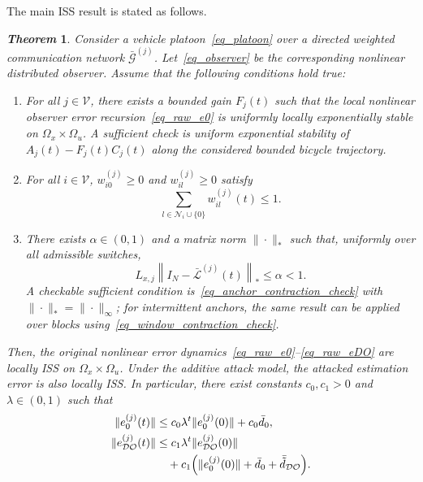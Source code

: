 \documentclass[journal,twoside]{IEEEtran}
\def\V{\mathcal{V}} %
\def\G{\mathcal{G}} %
\def\L{\mathcal{L}} %
\def\N{\mathcal{N}} %
\def\DO{\mathcal{DO}} %
\newtheorem{theorem}{\it Theorem}%
\begin{document}
The main ISS result is stated as follows.
\begin{theorem}\label{thm_observer}
Consider a vehicle platoon~\eqref{eq_platoon} over a directed weighted communication network $\bar{\G}^{(j)}$. Let~\eqref{eq_observer} be the corresponding nonlinear distributed observer. Assume that the following conditions hold true:
\begin{enumerate}
    \item For all $j \in \V$, there exists a bounded gain $F_{j}(t)$ such that the local nonlinear observer error recursion~\eqref{eq_raw_e0} is uniformly locally exponentially stable on $\Omega_x\times\Omega_u$. A sufficient check is uniform exponential stability of $A_j(t)-F_j(t)C_j(t)$ along the considered bounded bicycle trajectory.
    \item For all $i \in \V$, $w_{i0}^{(j)} \geq 0$ and $w_{il}^{(j)} \geq 0$ satisfy
    \begin{equation}\label{thm_W}%
    \sum_{l\in \N_i\cup\{0\}} w_{il}^{(j)}(t) \leq 1.
    \end{equation}
    \item There exists $\alpha \in (0,1)$ and a matrix norm $\| \cdot \|_*$ such that, uniformly over all admissible switches,
	\begin{equation} \label{assume3}
        L_{x,j}\left\| I_{N} - \bar{\L}^{(j)}(t) \right\|_* \leq \alpha < 1.
	\end{equation}
    A checkable sufficient condition is~\eqref{eq_anchor_contraction_check} with $\|\cdot\|_*=\|\cdot\|_{\infty}$; for intermittent anchors, the same result can be applied over blocks using~\eqref{eq_window_contraction_check}.
\end{enumerate}
Then, the original nonlinear error dynamics~\eqref{eq_raw_e0}--\eqref{eq_raw_eDO} are locally ISS on $\Omega_x\times\Omega_u$. Under the additive attack model, the attacked estimation error is also locally ISS. In particular, there exist constants $c_0, c_1 > 0$ and $\lambda \in (0,1)$ such that
\begin{align}
\|e_0^{(j)}(t)\| &\le c_0\lambda^t \|e_0^{(j)}(0)\| + c_0 \bar{d}_0,\\
\|e_{\DO}^{(j)}(t)\| &\le c_1\lambda^t \|e_{\DO}^{(j)}(0)\| \notag\\
&\quad+ c_1 \Big(\|e_0^{(j)}(0)\| + \bar{d}_0 + \bar{\tilde d}_{\DO}\Big).
\end{align}

\end{theorem}
\end{document}
